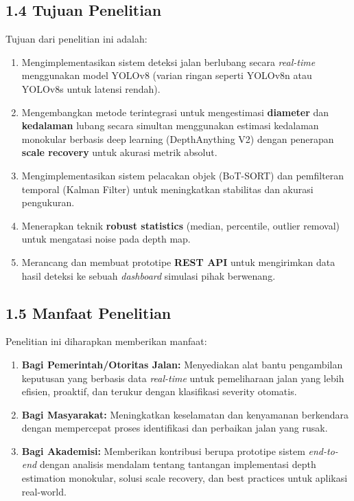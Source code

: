 \documentclass[12pt,a4paper]{article}
\begin{document}
\subsection*{1.4 Tujuan Penelitian}
Tujuan dari penelitian ini adalah:
\begin{enumerate}
    \item Mengimplementasikan sistem deteksi jalan berlubang secara \textit{real-time} menggunakan model YOLOv8 (varian ringan seperti YOLOv8n atau YOLOv8s untuk latensi rendah).
    \item Mengembangkan metode terintegrasi untuk mengestimasi \textbf{diameter} dan \textbf{kedalaman} lubang secara simultan menggunakan estimasi kedalaman monokular berbasis deep learning (DepthAnything V2) dengan penerapan \textbf{scale recovery} untuk akurasi metrik absolut.
    \item Mengimplementasikan sistem pelacakan objek (BoT-SORT) dan pemfilteran temporal (Kalman Filter) untuk meningkatkan stabilitas dan akurasi pengukuran.
    \item Menerapkan teknik \textbf{robust statistics} (median, percentile, outlier removal) untuk mengatasi noise pada depth map.
    \item Merancang dan membuat prototipe \textbf{REST API} untuk mengirimkan data hasil deteksi ke sebuah \textit{dashboard} simulasi pihak berwenang.
\end{enumerate}

\subsection*{1.5 Manfaat Penelitian}
Penelitian ini diharapkan memberikan manfaat:
\begin{enumerate}
    \item \textbf{Bagi Pemerintah/Otoritas Jalan:} Menyediakan alat bantu pengambilan keputusan yang berbasis data \textit{real-time} untuk pemeliharaan jalan yang lebih efisien, proaktif, dan terukur dengan klasifikasi severity otomatis.
    \item \textbf{Bagi Masyarakat:} Meningkatkan keselamatan dan kenyamanan berkendara dengan mempercepat proses identifikasi dan perbaikan jalan yang rusak.
    \item \textbf{Bagi Akademisi:} Memberikan kontribusi berupa prototipe sistem \textit{end-to-end} dengan analisis mendalam tentang tantangan implementasi depth estimation monokular, solusi scale recovery, dan best practices untuk aplikasi real-world.
\end{enumerate}
\end{document}
